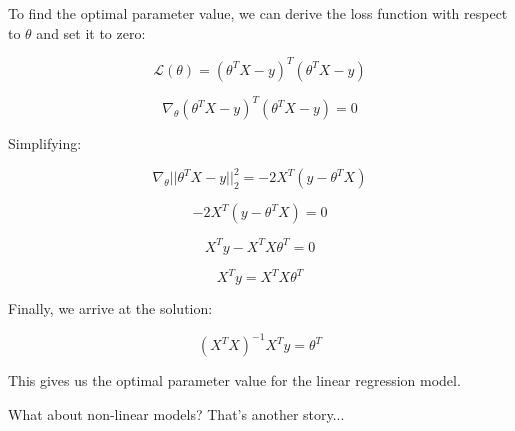 To find the optimal parameter value, we can derive the loss function with respect to $\theta$ and set it to zero:

\begin{equation}
    \mathcal{L}(\theta) = (\theta^T X - y)^T (\theta^T X - y)
\end{equation}

\begin{equation}
    \nabla_\theta (\theta^T X - y)^T (\theta^T X - y) = 0
\end{equation}

Simplifying:

\begin{equation}
    \nabla_\theta ||\theta^T X - y||_2^2 = -2X^T (y - \theta^T X)
\end{equation}

\begin{equation}
    -2X^T (y - \theta^T X) = 0
\end{equation}

\begin{equation}
    X^T y - X^T X \theta^T = 0
\end{equation}

\begin{equation}
    X^T y = X^T X \theta^T
\end{equation}

Finally, we arrive at the solution:

\begin{equation}
    (X^T X)^{-1} X^T y = \theta^T
\end{equation}

This gives us the optimal parameter value for the linear regression model.
\bigskip

What about non-linear models? That's another story...
